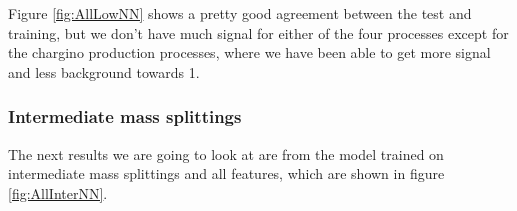 Figure \ref{fig:AllLowNN} shows a pretty good agreement between the test and training, but we don't have much signal for either of the four processes except for the chargino production processes, where we have been able to get more signal and less background towards 1.  













\subsubsection{Intermediate mass splittings}


The next results we are going to look at are from the model trained on intermediate mass splittings and all features, which are shown in figure \ref{fig:AllInterNN}.



